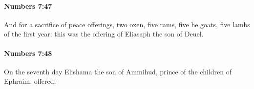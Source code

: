 		\paragraph{Numbers 7:47} %
			\label{NUMBERS-7-47}

			And for a sacrifice of peace offerings, two oxen, five rams, five he goats, five lambs of the first year: this was the offering of Eliasaph the son of Deuel.


		\paragraph{Numbers 7:48} %
			\label{NUMBERS-7-48}

			On the seventh day Elishama the son of Ammihud, prince of the children of Ephraim, offered:


